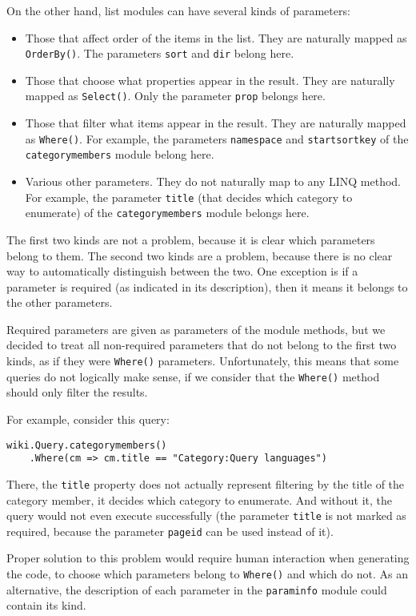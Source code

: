 \medskip

On the other hand, list modules can have several kinds of parameters:

\begin{itemize}
\item Those that affect order of the items in the list. They are naturally mapped as \lstinline{OrderBy()}.
The parameters \texttt{sort} and \texttt{dir} belong here.
\item Those that choose what properties appear in the result. They are naturally mapped as \lstinline{Select()}.
Only the parameter \texttt{prop} belongs here.
\item Those that filter what items appear in the result. They are naturally mapped as \lstinline{Where()}.
For example, the parameters \texttt{namespace} and \texttt{startsortkey}
of the \texttt{categorymembers} module belong here.
\item Various other parameters. They do not naturally map to any LINQ method.
For example, the parameter \texttt{title} (that decides which category to enumerate)
of the \texttt{categorymembers} module belongs here.
\end{itemize}

The first two kinds are not a problem, because it is clear which parameters belong to them.
The second two kinds are a problem, because there is no clear way to automatically distinguish between the two.
One exception is if a parameter is required (as indicated in its description),
then it means it belongs to the other parameters.

Required parameters are given as parameters of the module methods,
but we decided to treat all non-required parameters that do not belong to the first two kinds,
as if they were \lstinline{Where()} parameters.
Unfortunately, this means that some queries do not logically make sense,
if we consider that the \lstinline{Where()} method should only filter the results.

For example, consider this query:

\begin{lstlisting}
wiki.Query.categorymembers()
    .Where(cm => cm.title == "Category:Query languages")
\end{lstlisting}

There, the \lstinline{title} property does not actually represent filtering
by the title of the category member, it decides which category to enumerate.
And without it, the query would not even execute successfully
(the parameter \texttt{title} is not marked as required, because the parameter \texttt{pageid} can be used instead of it).

Proper solution to this problem would require human interaction when generating the code,
to choose which parameters belong to \lstinline{Where()} and which do not.
As an alternative, the description of each parameter in the \texttt{paraminfo} module could contain its kind.
